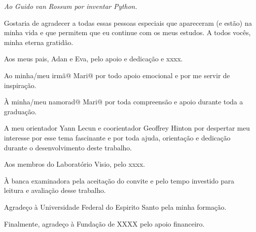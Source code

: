 \fi
\begin{dedicatoria}
   \vspace*{\fill}
   \centering
   \noindent
   \textit{Ao Guido van Rossum por inventar Python.
   } \vspace*{\fill}
\end{dedicatoria}


\begin{agradecimentos}

Gostaria de agradecer a todas essas pessoas especiais que apareceram (e estão) na minha vida e que permitem que eu continue com os meus estudos. A todos vocês, minha eterna gratidão.

Aos meus pais, Adan e Eva, pelo apoio e dedicação e xxxx.
    
Ao minha/meu irmã@ Mari@ por todo apoio emocional e por me servir de inspiração.

À minha/meu namorad@ Mari@ por toda compreensão e apoio durante toda a graduação.
    	
A meu orientador Yann Lecun e coorientador Geoffrey Hinton por despertar meu interesse por esse tema fascinante e por toda ajuda, orientação e dedicação durante o desenvolvimento deste trabalho.

Aos membros do Laboratório Visio, pelo xxxx.

À banca examinadora pela aceitação do convite e pelo tempo investido para leitura e avaliação desse trabalho.

Agradeço à Universidade Federal do Espirito Santo pela minha formação. 

Finalmente, agradeço à Fundação de XXXX pelo apoio financeiro.
\end{agradecimentos}



